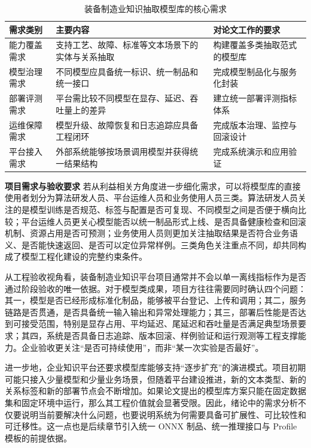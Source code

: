 \begin{table}[htbp]
  \centering
  \caption{装备制造业知识抽取模型库的核心需求}
  \vspace{0.5em}\wuhao
  \begin{tabularx}{\textwidth}{l X X}
    \toprule
    需求类别 & 主要内容 & 对论文工作的要求 \\
    \midrule
    能力覆盖需求 & 支持工艺、故障、标准等文本场景下的实体与关系抽取 & 构建覆盖多类抽取范式的模型库 \\
    模型治理需求 & 不同模型应具备统一标识、统一制品和统一接口 & 完成模型制品化与服务化封装 \\
    部署评测需求 & 平台需比较不同模型在显存、延迟、吞吐量上的差异 & 建立统一部署评测指标体系 \\
    运维保障需求 & 模型升级、故障恢复和日志追踪应具备工程闭环 & 完成版本治理、监控与回滚设计 \\
    平台接入需求 & 外部系统能够按场景调用模型并获得统一结果结构 & 完成系统演示和应用验证 \\
    \bottomrule
  \end{tabularx}
  \label{tab:intro_requirement_expand}
\end{table}

\par\textbf{项目需求与验收要求}
若从利益相关方角度进一步细化需求，可以将模型库的直接使用者划分为算法研发人员、平台运维人员和业务使用人员三类。算法研发人员关注的是模型训练是否规范、标签与配置是否可复现、不同模型之间是否便于横向比较；平台运维人员更关心模型能否以统一制品形式上线、是否具备健康检查和回滚机制、资源占用是否可预测；业务使用人员则更加关注抽取结果是否符合业务语义、是否能快速返回、是否可以定位异常样例。三类角色关注重点不同，却共同构成了模型工程化建设的完整约束条件。

从工程验收视角看，装备制造业知识平台项目通常并不会以单一离线指标作为是否通过阶段验收的唯一依据。对于模型类成果，项目方往往需要同时确认四个问题：其一，模型是否已经形成标准化制品，能够被平台登记、上传和调用；其二，服务链路是否贯通，是否具备统一输入输出和异常处理能力；其三，部署后性能是否达到可接受范围，特别是显存占用、平均延迟、尾延迟和吞吐量是否满足典型场景要求；其四，系统是否具备日志追踪、版本回滚、样例验证和运行观测等工程支撑能力。企业验收更关注“是否可持续使用”，而非“某一次实验是否最好”。

进一步地，企业知识平台还要求模型库能够支持“逐步扩充”的演进模式。项目初期可能只接入少量模型和少量业务场景，但随着平台建设推进，新的文本类型、新的关系标签和新的部署节点会不断增加。如果论文提出的模型库方案只能在固定数据集和固定环境中运行，那么其工程价值就会显著受限。因此，绪论中的需求分析不仅要说明当前要解决什么问题，也要说明系统为何需要具备可扩展性、可比较性和可迁移性。这一点也是后续章节引入统一 ONNX 制品、统一推理接口与 Profile 模板的前提依据。

